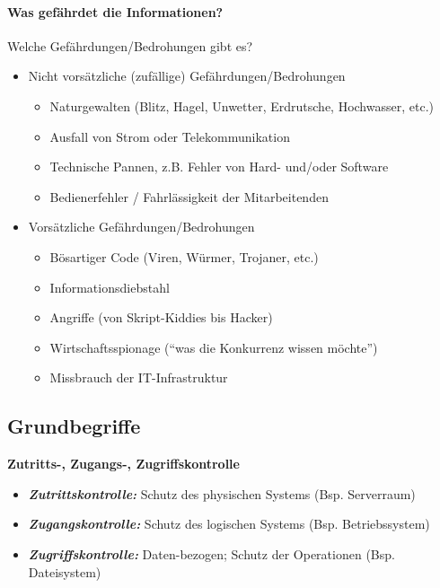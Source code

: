 \documentclass[10pt,a4paper]{article}
\begin{document}
\paragraph*{Was gefährdet die Informationen?} Welche Gefährdungen/Bedrohungen gibt es?
\begin{itemize}[noitemsep,topsep=0pt,leftmargin=*]
    \item Nicht vorsätzliche (zufällige) Gefährdungen/Bedrohungen
    \begin{itemize}[noitemsep,topsep=0pt,leftmargin=*]
        \item Naturgewalten (Blitz, Hagel, Unwetter, Erdrutsche, Hochwasser, etc.)
        \item Ausfall von Strom oder Telekommunikation
        \item Technische Pannen, z.B. Fehler von Hard- und/oder Software
        \item Bedienerfehler / Fahrlässigkeit der Mitarbeitenden
    \end{itemize}
    \item Vorsätzliche Gefährdungen/Bedrohungen
    \begin{itemize}[noitemsep,topsep=0pt,leftmargin=*]
        \item Bösartiger Code (Viren, Würmer, Trojaner, etc.)
        \item Informationsdiebstahl
        \item Angriffe (von Skript-Kiddies bis Hacker)
        \item Wirtschaftsspionage ("`was die Konkurrenz wissen möchte"')
        \item Missbrauch der IT-Infrastruktur
    \end{itemize}
\end{itemize}


\subsection*{Grundbegriffe}
\textbf{Zutritts-, Zugangs-, Zugriffskontrolle}
\begin{itemize}[noitemsep,topsep=0pt,leftmargin=*]
    \item \textbf{\textsl{Zutrittskontrolle: }}Schutz des physischen Systems (Bsp. Serverraum)
    \item \textbf{\textsl{Zugangskontrolle: }}Schutz des logischen Systems (Bsp. Betriebssystem)
    \item \textbf{\textsl{Zugriffskontrolle: }}Daten-bezogen; Schutz der Operationen (Bsp. Dateisystem)
\end{itemize}
\end{document}
